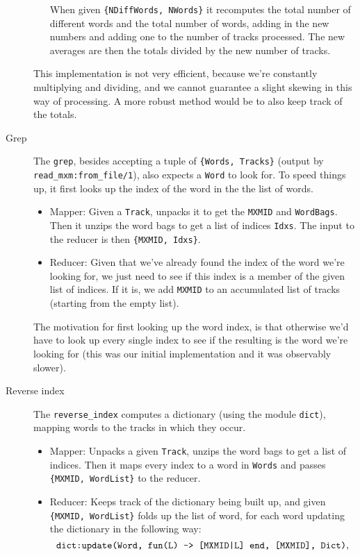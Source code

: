 \documentclass[a4paper]{article}
\begin{document}
\begin{description}
\begin{itemize}
    When given \texttt{\{NDiffWords, NWords\}} it recomputes the total number of different words and the total number of words, adding in the new numbers and adding one to the number of tracks processed. The new averages are then the totals divided by the new number of tracks.
  \end{itemize}
  This implementation is not very efficient, because we're constantly multiplying and dividing, and we cannot guarantee a slight skewing in this way of processing. A more robust method would be to also keep track of the totals.
\item[Grep]
  The \texttt{grep}, besides accepting a tuple of \texttt{\{Words, Tracks\}} (output by \texttt{read\_mxm:from\_file/1}), also expects a \texttt{Word} to look for. To speed things up, it first looks up the index of the word in the the list of words.
  \begin{itemize}
    \item Mapper: Given a \texttt{Track}, unpacks it to get the \texttt{MXMID} and \texttt{WordBags}. Then it unzips the word bags to get a list of indices \texttt{Idxs}. The input to the reducer is then \texttt{\{MXMID, Idxs\}}.
    \item Reducer: Given that we've already found the index of the word we're looking for, we just need to see if this index is a member of the given list of indices. If it is, we add \texttt{MXMID} to an accumulated list of tracks (starting from the empty list).
  \end{itemize}
  The motivation for first looking up the word index, is that otherwise we'd have to look up every single index to see if the resulting is the word we're looking for (this was our initial implementation and it was observably slower).
\item[Reverse index]
  The \texttt{reverse\_index} computes a dictionary (using the module \texttt{dict}), mapping words to the tracks in which they occur.
  \begin{itemize}
    \item Mapper: Unpacks a given \texttt{Track}, unzips the word bags to get a list of indices. Then it maps every index to a word in \texttt{Words} and passes \texttt{\{MXMID, WordList\}} to the reducer.
    \item Reducer: Keeps track of the dictionary being built up, and given \texttt{\{MXMID, WordList\}} folds up the list of word, for each word updating the dictionary in the following way:
      \[
      \text{\texttt{dict:update(Word, fun(L) -> [MXMID|L] end, [MXMID], Dict)}},
\]
\end{itemize}
\end{description}
\end{document}
